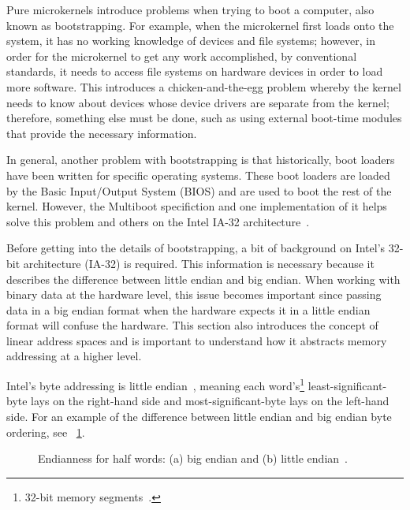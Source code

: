 
Pure microkernels introduce problems when trying to boot a computer, also known
as {\important bootstrapping}.  For example, when the microkernel first
loads onto the system, it has no working knowledge of devices and file
systems; however, in order for the microkernel to get any
work accomplished, by conventional standards, it needs to
access file systems on hardware devices in order to load more software.  This
introduces a chicken-and-the-egg problem
whereby the kernel needs to know about devices whose device drivers are
separate from the kernel; therefore, something else must
be done, such as using external boot-time modules that provide the
necessary information.

In general, another problem with bootstrapping is that historically, boot
loaders have been written for specific operating systems.  These
boot loaders are loaded by the Basic Input/Output System (BIOS) and
are used to boot the rest of the kernel.  However, the
Multiboot specifiction and one implementation of it helps solve this
problem and others on the Intel IA-32 architecture~\cite{grub_info}.


Before getting into the details of bootstrapping, a bit of background on
Intel's 32-bit architecture (IA-32) is required.  This information is
necessary because it describes the difference between little endian
and big endian.  When working with binary data at the hardware level,
this issue becomes important since passing data in a big endian format
when the hardware expects it in a little endian format will confuse the
hardware.  This section also introduces the concept of linear address
spaces and is important to understand how it abstracts memory addressing
at a higher level.

Intel's byte addressing is {\important little endian}~\cite{ia32-1-2004},
meaning each
{\important word}'s\footnote{32-bit memory segments~\cite{hennessy2003}.}
least-significant-byte lays on the right-hand side
and most-significant-byte lays on the left-hand side.
For an example of the difference between little endian and big endian
byte ordering, see \figurename~\ref{fig:endianness}.

	\begin{figure}[tb]
	\begin{center}
	\end{center}
	\caption{Endianness for half words: (a) big endian and (b) little
		endian~\cite{ia32-1-2004}.}
	\label{fig:endianness}
	\end{figure}

